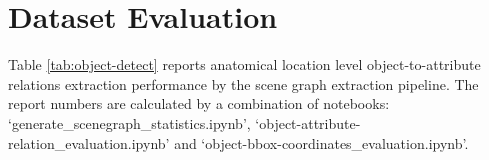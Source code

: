 \newpage
\section{Dataset Evaluation}


Table \ref{tab:object-detect} reports anatomical location level object-to-attribute relations extraction performance by the scene graph extraction pipeline. The report numbers are calculated by a combination of notebooks: `generate\_scenegraph\_statistics.ipynb', `object-attribute-relation\_evaluation.ipynb' and `object-bbox-coordinates\_evaluation.ipynb'.

